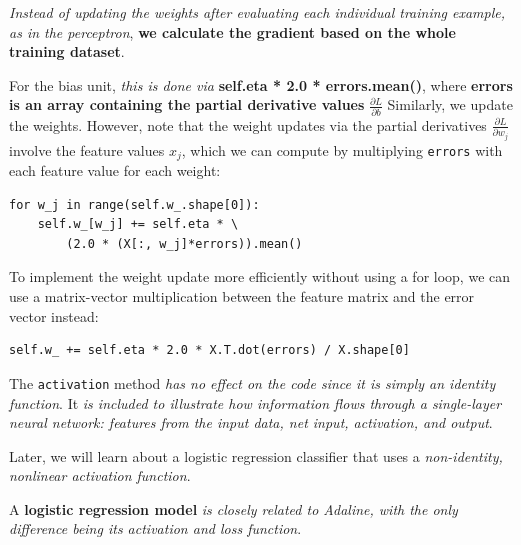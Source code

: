 \documentclass[../machine_learning_scikit.tex]{subfiles}
\begin{document}
    \begin{obs}
        \textit{Instead of updating the weights after evaluating each individual training example, as in the perceptron}, \textbf{we calculate the gradient based on the whole training dataset}.
    \end{obs}

    For the bias unit, \textit{this is done via} \textbf{self.eta * 2.0 * errors.mean()}, where \textbf{errors is an array containing the partial derivative values} $\frac{\partial L}{\partial b}$ Similarly, we update the weights. However, note that the weight updates via the partial derivatives $\frac{\partial L}{\partial w_j}$ involve the feature values $x_j$, which we can compute by multiplying \lstinline|errors| with each feature value for each weight:  

    \begin{lstlisting}[caption={Computation of Partial Derivatives},label=code:computation_partial_derivatives]
for w_j in range(self.w_.shape[0]):
    self.w_[w_j] += self.eta * \
        (2.0 * (X[:, w_j]*errors)).mean()
    \end{lstlisting}

    To implement the weight update more efficiently without using a for loop, we can use a matrix-vector multiplication between the feature matrix and the error vector instead:  

    \begin{lstlisting}[caption={Weight Update Optimization.},label=code:weight_update_optimization]
self.w_ += self.eta * 2.0 * X.T.dot(errors) / X.shape[0]
    \end{lstlisting}

    \begin{obs}
        The \lstinline|activation| method \textit{has no effect on the code since it is simply an identity function}. It \textit{is included to illustrate how information flows through a single-layer neural network: features from the input data, net input, activation, and output}.
    \end{obs}

    Later, we will learn about a logistic regression classifier that uses a \textit{non-identity, nonlinear activation function}.

    \begin{obs}
        A \textbf{logistic regression model} \textit{is closely related to Adaline, with the only difference being its activation and loss function}.
    \end{obs}
\end{document}
